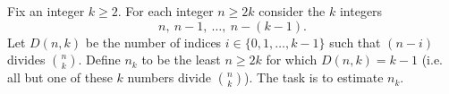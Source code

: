 Fix an integer $k\ge 2$. For each integer $n\ge 2k$ consider the $k$ integers
\[
 n,\ n-1,\ \dots,\ n-(k-1).
\]
Let $D(n,k)$ be the number of indices $i\in\{0,1,\dots,k-1\}$ such that $(n-i)$ divides $\binom{n}{k}$.
Define $n_k$ to be the least $n\ge 2k$ for which $D(n,k)=k-1$ (i.e. all but one of these $k$ numbers divide $\binom{n}{k}$).
The task is to estimate $n_k$.
